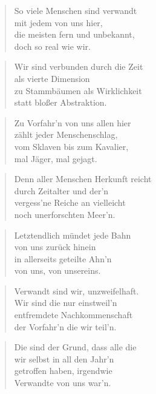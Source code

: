 \documentclass[10pt,a4paper]{article}
\begin{document}
\begin{paracol}{2}
\begin{verse}
So viele Menschen sind verwandt \\
mit jedem von uns hier, \\
die meisten fern und unbekannt, \\
doch so real wie wir. \\
\end{verse}

\begin{verse}
Wir sind verbunden durch die Zeit \\
als vierte Dimension \\
zu Stammbäumen als Wirklichkeit \\
statt bloßer Abstraktion. \\
\end{verse}

\begin{verse}
Zu Vorfahr’n von uns allen hier \\
zählt jeder Menschenschlag, \\
vom Sklaven bis zum Kavalier, \\
mal Jäger, mal gejagt. \\
\end{verse}

\begin{verse}
Denn aller Menschen Herkunft reicht \\
durch Zeitalter und der’n \\
vergess’ne Reiche an vielleicht \\
noch unerforschten Meer’n. \\
\end{verse}

\begin{verse}
Letztendlich mündet jede Bahn \\
von uns zurück hinein \\
in allerseits geteilte Ahn’n \\
von uns, von unsereins. \\
\end{verse}

\begin{verse}
Verwandt sind wir, unzweifelhaft. \\
Wir sind die nur einstweil’n \\
entfremdete Nachkommenschaft \\
der Vorfahr’n die wir teil’n. \\
\end{verse}

\begin{verse}
Die sind der Grund, dass alle die \\
wir selbst in all den Jahr’n \\
getroffen haben, irgendwie \\
Verwandte von uns war’n. \\
\end{verse}


\end{paracol}
\end{document}
